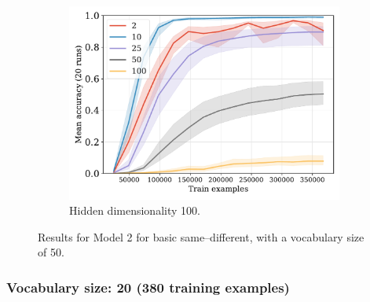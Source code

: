 \documentclass[12pt]{article}
\begin{document}
\begin{figure}[H]
  \begin{subfigure}{0.45\linewidth}
    \includegraphics[width=1\textwidth]{fig/fuzzy-lm-vocab50-train_size-embed_dim-hidden_dim=100.pdf}
    \caption{Hidden dimensionality 100.}
  \end{subfigure}

  \vspace{-3mm}

  \caption{Results for Model 2 for basic same--different, with a vocabulary size of 50.}
  \label{fig:model2:vocab50}
\end{figure}



\subsubsection{Vocabulary size: 20 (380 training examples)}
\end{document}
